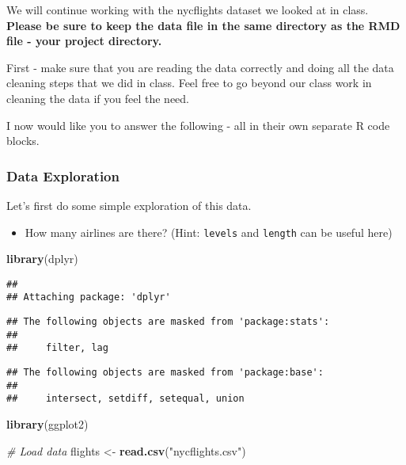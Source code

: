 \documentclass[
]{article}
\newenvironment{Shaded}{\begin{snugshade}}{\end{snugshade}}
\newcommand{\CommentTok}[1]{\textcolor[rgb]{0.56,0.35,0.01}{\textit{#1}}}
\newcommand{\KeywordTok}[1]{\textcolor[rgb]{0.13,0.29,0.53}{\textbf{#1}}}
\newcommand{\NormalTok}[1]{#1}
\newcommand{\StringTok}[1]{\textcolor[rgb]{0.31,0.60,0.02}{#1}}
\providecommand{\tightlist}{%
  \setlength{\itemsep}{0pt}\setlength{\parskip}{0pt}}
\begin{document}
We will continue working with the nycflights dataset we looked at in
class. \textbf{Please be sure to keep the data file in the same
directory as the RMD file - your project directory.}

First - make sure that you are reading the data correctly and doing all
the data cleaning steps that we did in class. Feel free to go beyond our
class work in cleaning the data if you feel the need.

I now would like you to answer the following - all in their own separate
R code blocks.

\hypertarget{data-exploration}{%
\subsubsection{Data Exploration}\label{data-exploration}}

Let's first do some simple exploration of this data.

\begin{itemize}
\tightlist
\item
  How many airlines are there? (Hint: \texttt{levels} and
  \texttt{length} can be useful here)
\end{itemize}

\begin{Shaded}
\begin{Highlighting}[]
\KeywordTok{library}\NormalTok{(dplyr)}
\end{Highlighting}
\end{Shaded}

\begin{verbatim}
## 
## Attaching package: 'dplyr'
\end{verbatim}

\begin{verbatim}
## The following objects are masked from 'package:stats':
## 
##     filter, lag
\end{verbatim}

\begin{verbatim}
## The following objects are masked from 'package:base':
## 
##     intersect, setdiff, setequal, union
\end{verbatim}

\begin{Shaded}
\begin{Highlighting}[]
\KeywordTok{library}\NormalTok{(ggplot2)}
\end{Highlighting}
\end{Shaded}

\begin{Shaded}
\begin{Highlighting}[]
\CommentTok{# Load data}
\NormalTok{flights <-}\StringTok{ }\KeywordTok{read.csv}\NormalTok{(}\StringTok{"nycflights.csv"}\NormalTok{)}
\end{Highlighting}
\end{Shaded}
\end{document}
